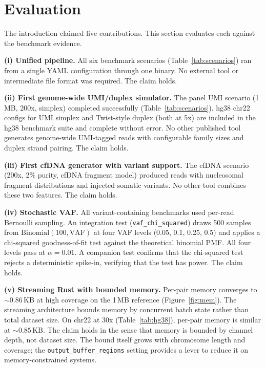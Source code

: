 \section{Evaluation}
\label{sec:evaluation}

The introduction claimed five contributions.
This section evaluates each against the benchmark evidence.

\textbf{(i) Unified pipeline.}
All six benchmark scenarios (Table~\ref{tab:scenarios}) ran from a single YAML configuration through one binary.
No external tool or intermediate file format was required.
The claim holds.

\textbf{(ii) First genome-wide UMI/duplex simulator.}
The panel UMI scenario (1\,MB, 200x, simplex) completed successfully (Table~\ref{tab:scenarios}).
hg38 chr22 configs for UMI simplex and Twist-style duplex (both at 5x) are included in the hg38 benchmark suite and complete without error.
No other published tool generates genome-wide UMI-tagged reads with configurable family sizes and duplex strand pairing.
The claim holds.

\textbf{(iii) First cfDNA generator with variant support.}
The cfDNA scenario (200x, 2\% purity, cfDNA fragment model) produced reads with nucleosomal fragment distributions and injected somatic variants.
No other tool combines these two features.
The claim holds.

\textbf{(iv) Stochastic VAF.}
All variant-containing benchmarks used per-read Bernoulli sampling.
An integration test (\texttt{vaf\_chi\_squared}) draws 500 samples from $\text{Binomial}(100, \text{VAF})$ at four VAF levels (0.05, 0.1, 0.25, 0.5) and applies a chi-squared goodness-of-fit test against the theoretical binomial PMF.
All four levels pass at $\alpha = 0.01$.
A companion test confirms that the chi-squared test rejects a deterministic spike-in, verifying that the test has power.
The claim holds.

\textbf{(v) Streaming Rust with bounded memory.}
Per-pair memory converges to ${\sim}0.86$\,KB at high coverage on the 1\,MB reference (Figure~\ref{fig:mem}).
The streaming architecture bounds memory by concurrent batch state rather than total dataset size.
On chr22 at 30x (Table~\ref{tab:hg38}), per-pair memory is similar at ${\sim}0.85$\,KB.
The claim holds in the sense that memory is bounded by channel depth, not dataset size.
The bound itself grows with chromosome length and coverage; the \texttt{output\_buffer\_regions} setting provides a lever to reduce it on memory-constrained systems.

